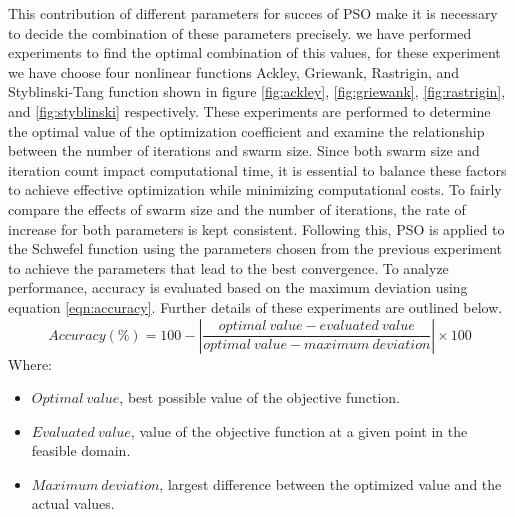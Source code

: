 \documentclass[paper,revised]{geophysics}
\begin{document}
This contribution of different parameters for succes of PSO make it is necessary to decide the combination of these parameters precisely. we have performed experiments to find the optimal combination of this values, for these experiment we have choose four nonlinear functions Ackley, Griewank, Rastrigin, and Styblinski-Tang function shown in figure \ref{fig:ackley}, \ref{fig:griewank}, \ref{fig:rastrigin}, and \ref{fig:styblinski} respectively. These experiments are performed to determine the optimal value of the optimization coefficient and examine the relationship between the number of iterations and swarm size. Since both swarm size and iteration count impact computational time, it is essential to balance these factors to achieve effective optimization while minimizing computational costs. To fairly compare the effects of swarm size and the number of iterations, the rate of increase for both parameters is kept consistent. Following this, PSO is applied to the Schwefel function using the parameters chosen from the previous experiment to achieve the parameters that lead to the best convergence. To analyze performance, accuracy is evaluated based on the maximum deviation using equation \ref{eqn:accuracy}. Further details of these experiments are outlined below.
\begin{equation}
	Accuracy (\%) = 100 - \left| \frac{optimal \ value - evaluated \ value}{optimal \ value - maximum \ deviation} \right| \times 100
	\label{eqn:accuracy}
\end{equation}
Where:
\begin{itemize}
	\item \(Optimal \  value\), best possible value of the objective function.
	\item \(Evaluated \ value\), value of the objective function at a given point in the feasible domain.
	\item \(Maximum \ deviation\), largest difference between the optimized value and the actual values.
\end{itemize}
\end{document}
